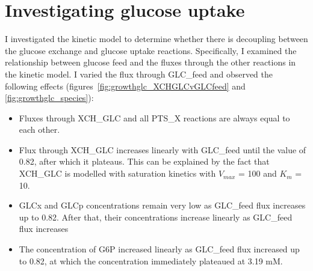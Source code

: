 \documentclass[parskip=full, numbers=noenddot]{scrreprt}
\begin{document}
\section{Investigating glucose uptake}
\label{sec:glucoseuptake}


I investigated the kinetic model to determine whether there is decoupling between the glucose exchange and glucose uptake reactions.
Specifically, I examined the relationship between glucose feed and the fluxes through the other reactions in the kinetic model. I varied the flux through GLC\_feed and observed the following effects (figures~\ref{fig:growthglc_XCHGLCvGLCfeed} and \ref{fig:growthglc_species}):

\begin{itemize}
\item Fluxes through XCH\_GLC and all PTS\_X reactions are always equal to each other.
\item Flux through XCH\_GLC increases linearly with GLC\_feed until the value of 0.82, after which it plateaus. This can be explained by the fact that XCH\_GLC is modelled with saturation kinetics with $V_{max}$ = 100 and $K_{m}$ = 10.
\item GLCx and GLCp concentrations remain very low as GLC\_feed flux increases up to 0.82. After that, their concentrations increase linearly as GLC\_feed flux increases
  \item The concentration of G6P increased linearly as GLC\_feed flux increased up to 0.82, at which the concentration immediately plateaued at 3.19 mM.
\end{itemize}
\end{document}

